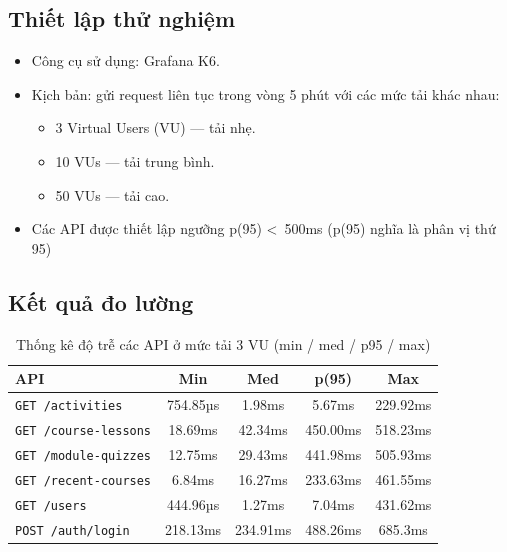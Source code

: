 \subsection{Thiết lập thử nghiệm}

\begin{itemize}
    \item Công cụ sử dụng: Grafana K6.
    \item Kịch bản: gửi request liên tục trong vòng 5 phút với các mức tải khác nhau:
    \begin{itemize}
        \item 3 Virtual Users (VU) — tải nhẹ.
        \item 10 VUs — tải trung bình.
        \item 50 VUs — tải cao.
    \end{itemize}
    \item Các API được thiết lập ngưỡng p(95) \textless~500ms (p(95) nghĩa là phân vị thứ 95)
\end{itemize}

\subsection{Kết quả đo lường}

\begin{table}[H]
\centering
\label{table:api_response_time}
\caption{Thống kê độ trễ các API ở mức tải 3 VU (min / med / p95 / max)}
\begin{tabular}{lcccc}
\toprule
\textbf{API} & \textbf{Min} & \textbf{Med} & \textbf{p(95)} & \textbf{Max} \\
\midrule
\texttt{GET /activities}         & 754.85µs & 1.98ms   & 5.67ms   & 229.92ms \\
\texttt{GET /course-lessons}     & 18.69ms  & 42.34ms  & 450.00ms & 518.23ms \\
\texttt{GET /module-quizzes}     & 12.75ms  & 29.43ms  & 441.98ms & 505.93ms \\
\texttt{GET /recent-courses}     & 6.84ms   & 16.27ms  & 233.63ms & 461.55ms \\
\texttt{GET /users}              & 444.96µs & 1.27ms   & 7.04ms   & 431.62ms \\
\texttt{POST /auth/login}        & 218.13ms & 234.91ms & 488.26ms & 685.3ms  \\
\bottomrule
\end{tabular}
\end{table}

